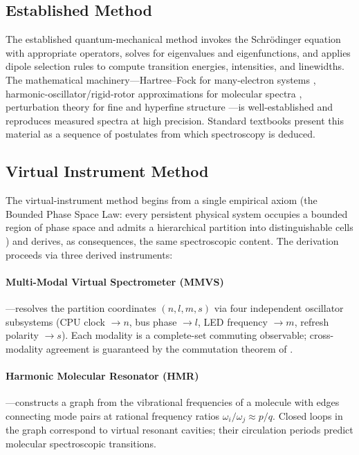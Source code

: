 \documentclass[twocolumn,11pt,a4paper]{article}
\theoremstyle{stmtstyle}
\theoremstyle{definition}
\theoremstyle{remark}
\begin{document}
\subsection{Established Method}

The established quantum-mechanical method invokes the Schr\"odinger equation with appropriate operators, solves for eigenvalues and eigenfunctions, and applies dipole selection rules to compute transition energies, intensities, and linewidths. The mathematical machinery---Hartree--Fock for many-electron systems \citep{hartree1928,fock1930}, harmonic-oscillator/rigid-rotor approximations for molecular spectra \citep{wilsondeciuscross1955}, perturbation theory for fine and hyperfine structure \citep{griffiths2018}---is well-established and reproduces measured spectra at high precision. Standard textbooks present this material as a sequence of postulates from which spectroscopy is deduced.

\subsection{Virtual Instrument Method}

The virtual-instrument method begins from a single empirical axiom (the Bounded Phase Space Law: every persistent physical system occupies a bounded region of phase space and admits a hierarchical partition into distinguishable cells \citep{sachikonye2026bps}) and derives, as consequences, the same spectroscopic content. The derivation proceeds via three derived instruments:

\paragraph{Multi-Modal Virtual Spectrometer (MMVS)}---resolves the partition coordinates $(n,l,m,s)$ via four independent oscillator subsystems (CPU clock $\to n$, bus phase $\to l$, LED frequency $\to m$, refresh polarity $\to s$). Each modality is a complete-set commuting observable; cross-modality agreement is guaranteed by the commutation theorem of \citet{sachikonye2026bps}.

\paragraph{Harmonic Molecular Resonator (HMR)}---constructs a graph from the vibrational frequencies of a molecule with edges connecting mode pairs at rational frequency ratios $\omega_{i}/\omega_{j} \approx p/q$. Closed loops in the graph correspond to virtual resonant cavities; their circulation periods predict molecular spectroscopic transitions.
\end{document}
